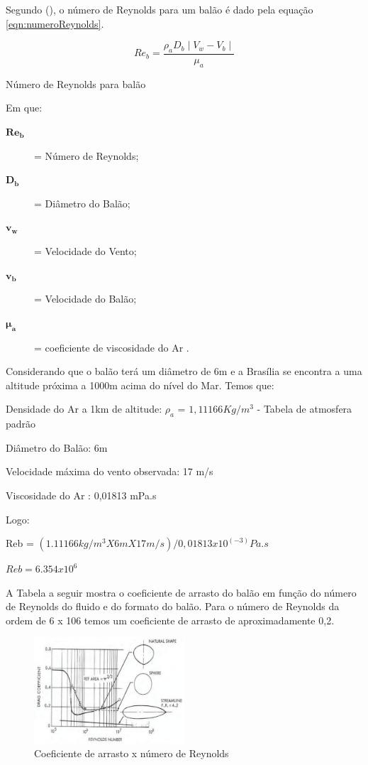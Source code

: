 	Segundo  (\citeyear{yajima}), o número de Reynolds para um balão é dado pela equação \eqref{eqn:numeroReynolds}.

	\begin{Equacao}[H]
		\begin{equation}
			Re_{b} = \frac{\rho_{a} D_{b} \mid V_{w} - V_{b} \mid}{\mu_{a}}
		\end{equation}
		\caption{Número de Reynolds para balão}
		\label{eqn:numeroReynolds}
	\end{Equacao}

	Em que:
	\begin{description}
		\item[$\boldsymbol{Re_{b}}$] = Número de Reynolds;
		\item[$\boldsymbol{D_{b}}$] = Diâmetro do Balão;
		\item[$\boldsymbol{v_{w}}$] = Velocidade do Vento;
		\item[$\boldsymbol{v_{b}}$] = Velocidade do Balão;
		\item[$\boldsymbol{\mu_{a}}$] = coeficiente de viscosidade do Ar .
	\end{description}

	Considerando que o balão terá um diâmetro de 6m e a Brasília se encontra a uma altitude próxima a 1000m acima do nível do Mar. Temos que:

	Densidade do Ar a 1km de altitude: $\rho_{a}$ = $1,11166 Kg/m^3$ - Tabela de atmosfera padrão~\cite{bird}

	Diâmetro do Balão: 6m

	Velocidade máxima do vento observada: 17 m/s

	Viscosidade do Ar : 0,01813 mPa.s~\cite{bird}

	Logo:

	Reb = $(1.11166 kg/m^3 X 6m X 17 m/s) / 0,01813 x 10^(-3) Pa.s$

	$Reb = 6.354 x 10^6$

	A Tabela a seguir mostra o coeficiente de arrasto do balão em função do número de Reynolds do fluido e do formato do balão. Para o número de Reynolds da ordem de 6 x 106  temos um coeficiente de arrasto de aproximadamente 0,2.

	\begin{figure}[H]
		\centering
		\includegraphics[width=0.5\textwidth]{figuras/coeficienteArrasto}
		\caption[Coeficiente de arrasto x número de Reynolds]{Coeficiente de arrasto x número de Reynolds~\cite{myers}}
		\label{img:coeficienteArrasto}
	\end{figure}


